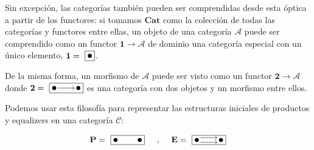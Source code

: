 Sin excepción, las categorías también pueden ser comprendidas desde esta óptica a partir de los functores: si tomamos $\textbf{Cat}$ como la colección de todas las categorías y functores entre ellas, un objeto de una categoría $\mathscr{A}$ puede ser comprendido como un functor $\textbf{1} \longrightarrow \mathscr{A}$ de dominio una categoría especial con un único elemento, $\textbf{1} = 
\raisebox{-0.1cm}{
\begin{tikzpicture}
    \node[draw, rectangle, minimum width=0.4cm, minimum height=0.4cm] (boxT) {}; %
    \node[fill=black, circle, inner sep=1.7pt] at (0, 0) {}; %
\end{tikzpicture}}$.

De la misma forma, un morfismo de $\mathscr{A}$ puede ser visto como un functor $\textbf{2} \longrightarrow \mathscr{A}$ donde $\textbf{2} = 
\raisebox{-0.1cm}{
\begin{tikzpicture}
    \node[draw, rectangle, minimum width=1.4cm, minimum height=0.4cm] (boxT) {}; %
    \node[fill=black, circle, inner sep=1.7pt] at (-0.5, 0) {}; %
    \node[fill=black, circle, inner sep=1.7pt] at (0.5, 0) {}; %
    \draw[->] (-0.35, 0) -- (0.35, 0); %
\end{tikzpicture}}$ es una categoría con dos objetos y un morfismo entre ellos. 

Podemos usar esta filosofía para representar las estructuras iniciales de productos y equalizers en una categoría $\mathscr{C}$:

$$
    \textbf{P} = 
    \raisebox{0.1cm}{
    \begin{tikzpicture}[baseline=(current bounding box.center)]
        \node[draw, rectangle, minimum width=1.4cm, minimum height=0.4cm] (boxT) {};
        \node[fill=black, circle, inner sep=1.7pt] at (-0.5, 0) {};
        \node[fill=black, circle, inner sep=1.7pt] at (0.5, 0) {};
    \end{tikzpicture}}
    \hspace{0.5cm} \text{,} \hspace{0.5cm}
    \textbf{E} = 
    \raisebox{0.1cm}{
    \begin{tikzpicture}[baseline=(current bounding box.center)]
        \node[draw, rectangle, minimum width=1.4cm, minimum height=0.4cm] (boxT) {};
        \node[fill=black, circle, inner sep=1.7pt] at (-0.5, 0) {};
        \node[fill=black, circle, inner sep=1.7pt] at (0.5, 0) {};
        \draw[->] (-0.35, 0.1) -- (0.35, 0.1);
        \draw[->] (-0.35, -0.1) -- (0.35, -0.1);
    \end{tikzpicture}}
$$

